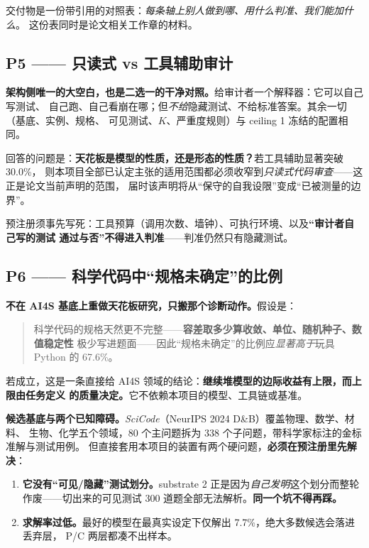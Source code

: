\documentclass[11pt,a4paper]{article}
\begin{document}
交付物是一份带引用的对照表：\emph{每条轴上别人做到哪、用什么判准、我们能加什么}。
这份表同时是论文相关工作章的材料。

\subsection{P5 —— 只读式 vs 工具辅助审计}

\textbf{架构侧唯一的大空白，也是二选一的干净对照。}给审计者一个解释器：它可以自己写测试、
自己跑、自己看崩在哪；但\emph{不给}隐藏测试、不给标准答案。其余一切（基底、实例、规格、
可见测试、$K$、严重度规则）与 ceiling 1 冻结的配置相同。

回答的问题是：\textbf{天花板是模型的性质，还是形态的性质？}若工具辅助显著突破 30.0\%，
则本项目全部已认定主张的适用范围都必须收窄到\emph{只读式代码审查}——这正是论文当前声明的范围，
届时该声明将从“保守的自我设限”变成“已被测量的边界”。

预注册须事先写死：工具预算（调用次数、墙钟）、可执行环境、以及\textbf{“审计者自己写的测试
通过与否”不得进入判准}——判准仍然只有隐藏测试。

\subsection{P6 —— 科学代码中“规格未确定”的比例}

\textbf{不在 AI4S 基底上重做天花板研究，只搬那个诊断动作。}假设是：

\begin{quote}
科学代码的规格天然更不完整——\textbf{容差取多少算收敛、单位、随机种子、数值稳定性}
极少写进题面——因此“规格未确定”的比例应\emph{显著高于}玩具 Python 的 67.6\%。
\end{quote}

若成立，这是一条直接给 AI4S 领域的结论：\textbf{继续堆模型的边际收益有上限，而上限由任务定义
的质量决定。}它不依赖本项目的模型、工具链或基准。

\textbf{候选基底与两个已知障碍。}\emph{SciCode}（NeurIPS 2024 D\&B）覆盖物理、数学、材料、
生物、化学五个领域，80 个主问题拆为 338 个子问题，带科学家标注的金标准解与测试用例。
但直接套用本项目的装置有两个硬问题，\textbf{必须在预注册里先解决}：

\begin{enumerate}[label=\textbf{障碍 \arabic*：}]
\item \textbf{它没有“可见/隐藏”测试划分。}substrate 2 正是因为\emph{自己发明}这个划分而整轮
      作废——切出来的可见测试 300 道题全部无法解析。\textbf{同一个坑不得再踩。}
\item \textbf{求解率过低。}最好的模型在最真实设定下仅解出 7.7\%，绝大多数候选会落进丢弃层，
      P/C 两层都凑不出样本。
\end{enumerate}
\end{document}
